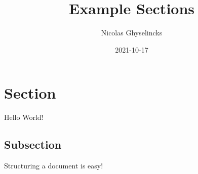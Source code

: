 \documentclass{article}
\title{Example Sections}
\date{2021-10-17}
\author{Nicolas Ghyselincks}
\begin{document}
    
    \maketitle
    \newpage

    \section{Section}

    Hello World!

    \subsection{Subsection}

    Structuring a document is easy!
\end{document}
